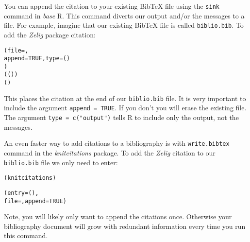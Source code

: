 \noindent You can append the citation to your existing BibTeX file using the \texttt{sink} command in \emph{base} R. This command diverts our output and/or the messages to a file. For example, imagine that our existing BibTeX file is called \texttt{biblio.bib}. To add the \emph{Zelig} package citation:

\begin{knitrout}
\color{fgcolor}\begin{kframe}
\begin{alltt}
(file = , 
     append = TRUE, type = ()
     )      
(()) 
()
\end{alltt}
\end{kframe}
\end{knitrout}


\noindent This places the citation at the end of our \texttt{biblio.bib} file. It is very important to include the argument \texttt{append = TRUE}. If you don't you will erase the existing file. The argument \texttt{type = c("output")} tells R to include only the output, not the messages.

An even faster way to add citations to a bibliography is with \texttt{write.bibtex} command in the \emph{knitcitations} package. To add the \emph{Zelig} citation to our \texttt{biblio.bib} file we only need to enter:

\begin{knitrout}
\color{fgcolor}\begin{kframe}
\begin{alltt}
(knitcitations)
 
(entry = (), 
              file = , append = TRUE)
\end{alltt}
\end{kframe}
\end{knitrout}


\noindent Note, you will likely only want to append the citations once. Otherwise your bibliography document will grow with redundant information every time you run this command.

